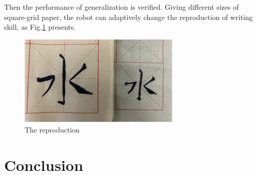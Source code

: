 \documentclass[journal]{IEEEtran}
\begin{document}
Then the performance of generalization is verified. Giving different sizes of square-grid paper, the robot can adaptively change the reproduction of writing skill, as Fig.\ref{fig9} presents.
\begin{figure}[!t]
    \centering
    \includegraphics[width=3in]{./fig/fig9.pdf}
    \caption{The reproduction}
    \label{fig9}
\end{figure}

\section{Conclusion}


\end{document}
